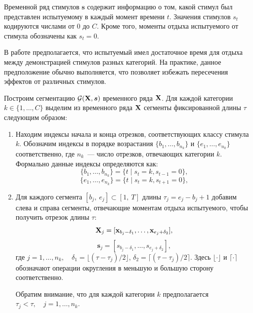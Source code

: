 Временной ряд стимулов $\bm{s}$ содержит информацию о том, какой стимул был представлен испытуемому в каждый момент времени $t$. Значения стимулов ${s}_{t}$ кодируются числами от $0$ до $C$. Кроме того, моменты отдыха испытуемого от стимула обозначены как $s_t = 0$.
\begin{assumption}
    В работе предполагается, что испытуемый имел достаточное время для отдыха между демонстрацией стимулов разных категорий. На практике, данное предположение обычно выполняется, что позволяет избежать пересечения эффектов от различных стимулов. 
\end{assumption}
Построим сегментацию $\mathcal{G}(\mathbf{X}, \bm{s})$ временного ряда $\mathbf{X}$.
Для каждой категории $k \in \{1,\dots,C\}$ выделим из временного ряда $\mathbf{X}$ сегменты фиксированной длины $\tau$ следующим образом:
\begin{enumerate}
	\item Находим индексы начала и конца отрезков, соответствующих классу стимула $k$. 
	Обозначим индексы в порядке возрастания $\{b_{1}, \ldots, b_{n_{k}}\}$ и $\{e_{1}, \ldots, e_{n_{k}}\}$ соответственно, 
	где $n_{k}$~--- число отрезков, отвечающих категории $k$. 
	Формально данные индексы определяются как:
	\begin{equation*}
	\{b_{1}, \ldots, b_{n_{k}}\} = \{t \mid {s}_{t}=k, {s}_{t-1}=0\},
	\end{equation*}
	\begin{equation*}
	\{e_{1}, \ldots, e_{n_{k}}\} = \{t \mid {s}_{t}=k, {s}_{t+1}=0\},
	\end{equation*}

	\item Для каждого сегмента $[b_{j},~e_{j}] \subset [1,~T]$ длины $\tau_{j} = e_{j} - b_{j} + 1$ добавим слева и 
	справа сегменты, отвечающие моментам отдыха испытуемого,  
	чтобы получить отрезок длины $\tau$:
	\begin{equation*}
	\mathbf{X}_{j} = [\mathbf{x}_{b_{j}-\delta_1}, \ldots, \mathbf{x}_{e_{j}+\delta_2}],
	\end{equation*}
	\begin{equation*}
		\bm{s}_{j} = [s_{b_{j}-\delta_1}, \ldots, s_{e_{j}+\delta_2}],
	\end{equation*}
	где $j = 1,\ldots, n_{k}, \quad \delta_1 = \lfloor (\tau - \tau_{j})/2 \rfloor$, $\delta_2 = \lceil (\tau - \tau_{j})/2 \rceil$. Здесь $\lfloor \cdot \rfloor$ и $\lceil \cdot \rceil$ обозначают операции округления в меньшую и большую сторону соответственно.
        
	Обратим внимание, что для каждой категории $k$ предполагается $\tau_{j} < \tau,\quad j = 1,\ldots, n_{k}$.


\end{enumerate}
